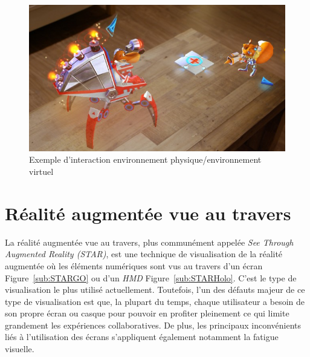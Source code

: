 \begin{figure}[H]
\centering
\includegraphics[scale=0.4]{images/youngconker}
\caption{Exemple d'interaction environnement physique/environnement virtuel\protect\footnotemark}
\label{fig:youngconker}
\end{figure}

\section{Réalité augmentée vue au travers}
La réalité augmentée vue au travers\cite{milgram1995augmented}, plus communément appelée \emph{See Through Augmented Reality (STAR)}, est une technique de visualisation de la réalité augmentée où les éléments numériques sont vus au travers d'un écran Figure~\ref{sub:STARGO} ou d'un \emph{HMD} Figure~\ref{sub:STARHolo}. C'est le type de visualisation le plus utilisé actuellement. Toutefois, l'un des défauts majeur de ce type de visualisation est que, la plupart du temps, chaque utilisateur a besoin de son propre écran ou casque pour pouvoir en profiter pleinement ce qui limite grandement les expériences collaboratives. De plus, les principaux inconvénients liés à l'utilisation des écrans s'appliquent également notamment la fatigue visuelle.  

